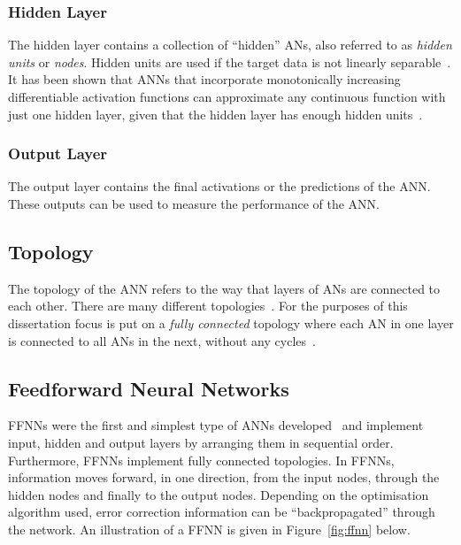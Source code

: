 \subsubsection{Hidden Layer}\label{sec:anns:anns:architecture:hidden}

The hidden layer contains a collection of ``hidden'' \acp{AN}, also referred to as \textit{hidden units} or \textit{nodes}. Hidden units are used if the target data is not linearly separable~\cite{ref:engelbrecht:2007}. It has been shown that \acp{ANN} that incorporate monotonically increasing differentiable activation functions can approximate any continuous function with just one hidden layer, given that the hidden layer has enough hidden units~\cite{ref:hornik:1989}.

\subsubsection{Output Layer}\label{sec:anns:anns:architecture:output}

The output layer contains the final activations or the predictions of the \acs{ANN}. These outputs can be used to measure the performance of the \acs{ANN}.


\subsection{Topology}
\label{sec:anns:anns:topology}

The topology of the \acs{ANN} refers to the way that layers of \acp{AN} are connected to each other. There are many different topologies~\cite{ref:miikkulainen:2010}. For the purposes of this dissertation focus is put on a \textit{fully connected} topology where each \acs{AN} in one layer is connected to all \acp{AN} in the next, without any cycles~\cite{ref:zell:1994}.


\subsection{Feedforward Neural Networks}\label{sec:anns:anns:ffnns}

\acp{FFNN} were the first and simplest type of \acp{ANN} developed~\cite{ref:schmidhuber:2015} and implement input, hidden and output layers by arranging them in sequential order. Furthermore, \acp{FFNN} implement fully connected topologies. In \acp{FFNN}, information moves forward, in one direction, from the input nodes, through the hidden nodes and finally to the output nodes. Depending on the optimisation algorithm used, error correction information can be ``backpropagated'' through the network. An illustration of a \acs{FFNN} is given in Figure~\ref{fig:ffnn} below.

